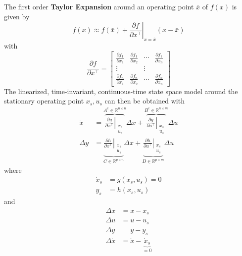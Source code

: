 The first order \textbf{Taylor Expansion} around an operating point $\bar{x}$ of $f(x)$ is given by
\begin{equation*}
    f(x) \approx f(\bar{x}) + \left. \frac{\partial f}{\partial x^\top} \right\rvert_{x=\bar{x}} (x-\bar{x})
\end{equation*}
with
\begin{equation*}
    \frac{\partial f}{\partial x^\top} = \begin{bmatrix}
        \frac{\partial f_1}{\partial x_1} & \frac{\partial f_1}{\partial x_2} & \cdots & \frac{\partial f_1}{\partial x_n} \\
        \vdots                            &                                   & \vdots                                     \\
        \frac{\partial f_n}{\partial x_1} & \frac{\partial f_n}{\partial x_2} & \cdots & \frac{\partial f_n}{\partial x_n}
    \end{bmatrix}
\end{equation*}
The linearized, time-invariant, continuous-time state space model around the stationary operating point $x_s, u_s$ can then be obtained with
\begin{align*}
    \dot{x}  & =
    \overbrace{\left. \frac{\partial g}{\partial x^\top} \right\rvert_{\substack{x_s  \\u_s}}}^{A^c \in \mathbb{R}^{n\times n}} \Delta x +
    \overbrace{\left. \frac{\partial g}{\partial u^\top} \right\rvert_{\substack{x_s  \\u_s}}}^{B^c \in \mathbb{R}^{n\times m}} \Delta u \\
    \Delta y & =
    \underbrace{\left. \frac{\partial h}{\partial x^\top} \right\rvert_{\substack{x_s \\u_s}}}_{C \in \mathbb{R}^{p\times n}} \Delta x +
    \underbrace{\left. \frac{\partial h}{\partial u^\top} \right\rvert_{\substack{x_s \\u_s}}}_{D \in \mathbb{R}^{p \times m}} \Delta u
\end{align*}
where
\begin{align*}
    \dot{x}_s & = g(x_s,u_s) = 0 \\
    y_s       & = h(x_s,u_s)
\end{align*}
and
\begin{align*}
    \Delta x       & = x - x_s                               \\
    \Delta u       & = u - u_s                               \\
    \Delta y       & = y - y_s                               \\
    \Delta \dot{x} & = \dot{x} - \underbrace{\dot{x}_s}_{=0}
\end{align*}

